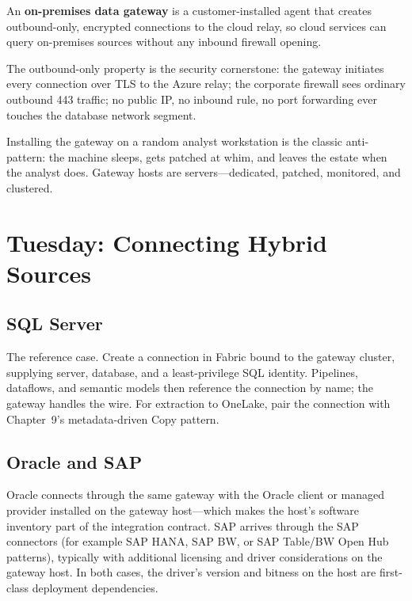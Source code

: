 \begin{definitionbox}
An \textbf{on-premises data gateway} is a customer-installed agent that creates outbound-only, encrypted connections to the cloud relay, so cloud services can query on-premises sources without any inbound firewall opening.
\end{definitionbox}

The outbound-only property is the security cornerstone: the gateway initiates every connection over TLS to the Azure relay; the corporate firewall sees ordinary outbound 443 traffic; no public IP, no inbound rule, no port forwarding ever touches the database network segment.

\begin{pitfall}
Installing the gateway on a random analyst workstation is the classic anti-pattern: the machine sleeps, gets patched at whim, and leaves the estate when the analyst does. Gateway hosts are servers---dedicated, patched, monitored, and clustered.
\end{pitfall}

\section{Tuesday: Connecting Hybrid Sources}
\subsection{SQL Server}
The reference case. Create a connection in Fabric bound to the gateway cluster, supplying server, database, and a least-privilege SQL identity. Pipelines, dataflows, and semantic models then reference the connection by name; the gateway handles the wire. For extraction to OneLake, pair the connection with Chapter~9's metadata-driven Copy pattern.

\subsection{Oracle and SAP}
Oracle connects through the same gateway with the Oracle client or managed provider installed on the gateway host---which makes the host's software inventory part of the integration contract. SAP arrives through the SAP connectors (for example SAP HANA, SAP BW, or SAP Table/BW Open Hub patterns), typically with additional licensing and driver considerations on the gateway host. In both cases, the driver's version and bitness on the host are first-class deployment dependencies.

